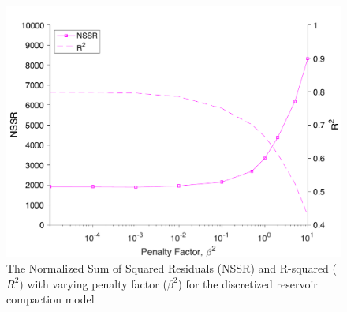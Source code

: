 \documentclass{utexasthesis}
\begin{document}
\begin{figure}
	\centering
	\includegraphics[width=\textwidth]{paper1-permian/figures/supplement/figureS12-reservoir-nssr.pdf}
	\caption{The Normalized Sum of Squared Residuals (NSSR) and R-squared ($ R^2 $) with varying penalty factor ($ \beta^2 $) for the discretized reservoir compaction model
	}
	\label{fig:model-reservoir-nssr}
\end{figure}
\end{document}
